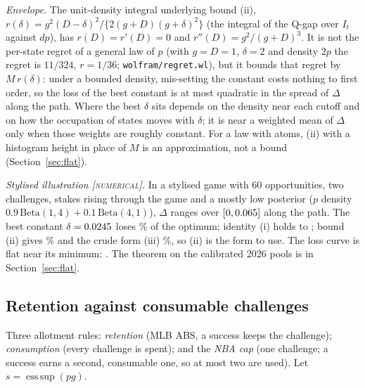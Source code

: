 \documentclass[aoas]{imsart}
\theoremstyle{plain}
\theoremstyle{definition}
\newcommand{\status}[1]{\textup{[\textsc{#1}]}}
\begin{document}
\noindent\emph{Envelope.} The unit-density integral underlying bound (ii), $r(\delta)=g^2(D-\delta)^2/\{2(g+D)(g+\delta)^2\}$
(the integral of the Q-gap over $I_t$ against $dp$), has $r(D)=r'(D)=0$ and $r''(D)=g^2/(g+D)^3$. It is not the
per-state regret of a general law of $p$ (with $g=D=1$, $\delta=2$ and density $2p$ the regret is $11/324$, $r=1/36$;
\nolinkurl{wolfram/regret.wl}), but it bounds that regret by $M\,r(\delta)$: under a bounded density, mis-setting the
constant costs nothing to first order, so the loss of the best constant is at most quadratic in the spread of
$\Delta$ along the path. Where the best $\delta$ sits depends on the density near each cutoff and on how the
occupation of states moves with $\delta$; it is near a weighted mean of $\Delta$ only when those weights are roughly
constant. For a law with atoms, (ii) with a histogram height in place of $M$ is an approximation, not a bound
(Section~\ref{sec:flat}).

\noindent\emph{Stylised illustration \status{numerical}.} In a stylised game with 60 opportunities, two challenges,
stakes rising through the game and a mostly low posterior ($p$ density $0.9\,\mathrm{Beta}(1,4)+0.1\,
\mathrm{Beta}(4,1)$), $\Delta$ ranges over $[0,0.065]$ along the path. The best constant
$\delta=0.0245$ loses \SStylLoss\% of the optimum; identity (i) holds to \SStylIdentityGap; bound (ii) gives
\SStylBound\% and the crude form (iii) \SStylCrude\%, so (ii) is the form to use. The loss curve is flat near its
minimum: \SStylLossVsDelta. The theorem on the calibrated 2026 pools is in Section~\ref{sec:flat}.

\subsection{Retention against consumable challenges}
Three allotment rules: \emph{retention} (MLB ABS, a success keeps the challenge); \emph{consumption} (every challenge
is spent); and the \emph{NBA cap} (one challenge; a success earns a second, consumable one, so at most two are used).
Let $s=\operatorname{ess\,sup}(pg)$.
\end{document}
